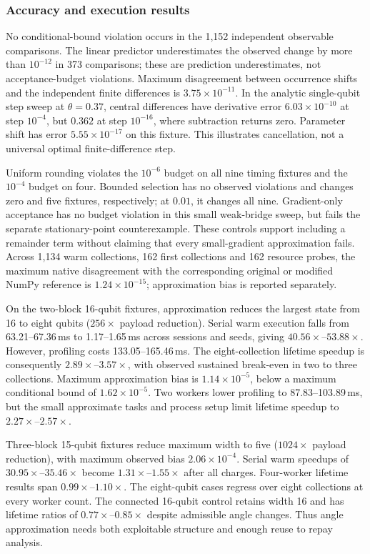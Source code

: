 \subsubsection{Accuracy and execution results}
No conditional-bound violation occurs in the 1,152 independent observable comparisons. The linear predictor underestimates the observed change by more than $10^{-12}$ in 373 comparisons; these are prediction underestimates, not acceptance-budget violations. Maximum disagreement between occurrence shifts and the independent finite differences is $3.75\times10^{-11}$. In the analytic single-qubit step sweep at $\theta=0.37$, central differences have derivative error $6.03\times10^{-10}$ at step $10^{-4}$, but $0.362$ at step $10^{-16}$, where subtraction returns zero. Parameter shift has error $5.55\times10^{-17}$ on this fixture. This illustrates cancellation, not a universal optimal finite-difference step.

Uniform rounding violates the $10^{-6}$ budget on all nine timing fixtures and the $10^{-4}$ budget on four. Bounded selection has no observed violations and changes zero and five fixtures, respectively; at $0.01$, it changes all nine. Gradient-only acceptance has no budget violation in this small weak-bridge sweep, but fails the separate stationary-point counterexample. These controls support including a remainder term without claiming that every small-gradient approximation fails. Across 1,134 warm collections, 162 first collections and 162 resource probes, the maximum native disagreement with the corresponding original or modified NumPy reference is $1.24\times10^{-15}$; approximation bias is reported separately.

On the two-block 16-qubit fixtures, approximation reduces the largest state from 16 to eight qubits ($256\times$ payload reduction). Serial warm execution falls from 63.21--67.36\,ms to 1.17--1.65\,ms across sessions and seeds, giving $40.56\times$--$53.88\times$. However, profiling costs 133.05--165.46\,ms. The eight-collection lifetime speedup is consequently $2.89\times$--$3.57\times$, with observed sustained break-even in two to three collections. Maximum approximation bias is $1.14\times10^{-5}$, below a maximum conditional bound of $1.62\times10^{-5}$. Two workers lower profiling to 87.83--103.89\,ms, but the small approximate tasks and process setup limit lifetime speedup to $2.27\times$--$2.57\times$.

Three-block 15-qubit fixtures reduce maximum width to five ($1024\times$ payload reduction), with maximum observed bias $2.06\times10^{-4}$. Serial warm speedups of $30.95\times$--$35.46\times$ become $1.31\times$--$1.55\times$ after all charges. Four-worker lifetime results span $0.99\times$--$1.10\times$. The eight-qubit cases regress over eight collections at every worker count. The connected 16-qubit control retains width 16 and has lifetime ratios of $0.77\times$--$0.85\times$ despite admissible angle changes. Thus angle approximation needs both exploitable structure and enough reuse to repay analysis.

